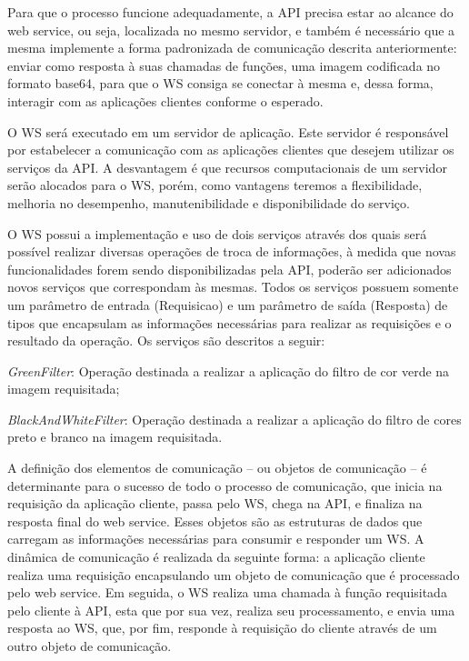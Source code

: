 \documentclass[12pt]{article}
\begin{document}
Para que o processo funcione adequadamente, a API precisa estar ao alcance do web service, ou seja, localizada no mesmo servidor, e também é necessário que a mesma implemente a forma padronizada de comunicação descrita anteriormente: enviar como resposta à suas chamadas de funções, uma imagem codificada no formato base64, para que o
WS consiga se conectar à mesma e, dessa forma, interagir com as aplicações clientes conforme o esperado.

O WS será executado em um servidor de aplicação. Este servidor
é responsável por estabelecer a comunicação com as aplicações clientes que desejem utilizar os serviços da API. 
A desvantagem é que recursos computacionais de um servidor serão alocados para o WS, porém, como vantagens teremos a flexibilidade, melhoria no desempenho, manutenibilidade e disponibilidade do serviço.


O WS possui a implementação e uso de dois serviços através dos quais será possível realizar diversas operações de troca de informações, à medida que novas funcionalidades forem sendo disponibilizadas pela API, poderão ser adicionados novos serviços que correspondam às mesmas.
Todos os serviços possuem somente um parâmetro de entrada (Requisicao) e um parâmetro de saída (Resposta) de tipos que encapsulam as informações necessárias para realizar as requisições e o resultado da operação. Os serviços são descritos a seguir:


\textit{GreenFilter}: Operação destinada a realizar a aplicação do filtro de cor verde na imagem requisitada;

\textit{BlackAndWhiteFilter}: Operação destinada a realizar a aplicação do filtro de cores preto e branco na imagem requisitada.

A definição dos elementos de comunicação – ou objetos de comunicação – é
determinante para o sucesso de todo o processo de comunicação, que inicia na requisição da aplicação cliente, passa pelo WS, chega na API, e finaliza na resposta final do web service. Esses objetos são as estruturas de dados que carregam as informações necessárias para consumir e responder um WS.
A dinâmica de comunicação é realizada da seguinte forma: a aplicação cliente realiza uma requisição encapsulando um objeto de comunicação que é processado pelo web service. Em seguida, o WS realiza uma chamada à função requisitada pelo cliente à API, esta que por sua vez, realiza seu processamento, e envia uma resposta ao WS, que, por fim, responde à requisição do cliente através de um outro objeto de comunicação.
\end{document}
